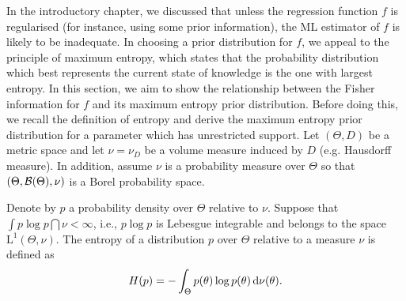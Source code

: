 In the introductory chapter, we discussed that unless the regression function $f$ is regularised (for instance, using some prior information), the ML estimator of $f$ is likely to be inadequate.
In choosing a prior distribution for $f$, we appeal to the principle of maximum entropy, which states that the probability distribution which best represents the current state of knowledge is the one with largest entropy.
In this section, we aim to show the relationship between the Fisher information for $f$ and its maximum entropy prior distribution.
Before doing this, we recall the definition of entropy and derive the maximum entropy prior distribution for a parameter which has unrestricted support.
Let $(\Theta,D)$ be a metric space and let $\nu = \nu_D$ be a volume measure induced by $D$ (e.g. Hausdorff measure).
In addition, assume $\nu$ is a probability measure over $\Theta$ so that $(\Theta,{\mathcal B}(\Theta),\nu)$ is a Borel probability space.

\begin{definition}[Entropy]\label{def:entropy}
  Denote by $p$ a probability density over $\Theta$ relative to $\nu$.
  Suppose that $\int p\log p \dint \nu < \infty$, i.e., $p \log p$ is Lebesgue integrable and belongs to the space $\text{L}^1(\Theta,\nu)$.
  The entropy of a distribution $p$ over $\Theta$ relative to a measure $\nu$ is defined as
  \[
    H(p) = - \int_\Theta p(\theta) \log p(\theta) \, \text{d}\nu(\theta).
  \]
\end{definition}


